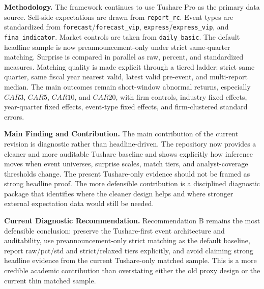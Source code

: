 \documentclass[11pt]{article}
\begin{document}
\noindent\textbf{Methodology.} The framework continues to use Tushare Pro as the primary data source. Sell-side expectations are drawn from \texttt{report\_rc}. Event types are standardized from \texttt{forecast}/\texttt{forecast\_vip}, \texttt{express}/\texttt{express\_vip}, and \texttt{fina\_indicator}. Market controls are taken from \texttt{daily\_basic}. The default headline sample is now preannouncement-only under strict same-quarter matching. Surprise is compared in parallel as raw, percent, and standardized measures. Matching quality is made explicit through a tiered ladder: strict same quarter, same fiscal year nearest valid, latest valid pre-event, and multi-report median. The main outcomes remain short-window abnormal returns, especially \(CAR3\), \(CAR5\), \(CAR10\), and \(CAR20\), with firm controls, industry fixed effects, year-quarter fixed effects, event-type fixed effects, and firm-clustered standard errors.

\noindent\textbf{Main Finding and Contribution.} The main contribution of the current revision is diagnostic rather than headline-driven. The repository now provides a cleaner and more auditable Tushare baseline and shows explicitly how inference moves when event universes, surprise scales, match tiers, and analyst-coverage thresholds change. The present Tushare-only evidence should not be framed as strong headline proof. The more defensible contribution is a disciplined diagnostic package that identifies where the cleaner design helps and where stronger external expectation data would still be needed.

\noindent\textbf{Current Diagnostic Recommendation.} Recommendation B remains the most defensible conclusion: preserve the Tushare-first event architecture and auditability, use preannouncement-only strict matching as the default baseline, report raw/pct/std and strict/relaxed tiers explicitly, and avoid claiming strong headline evidence from the current Tushare-only matched sample. This is a more credible academic contribution than overstating either the old proxy design or the current thin matched sample.
\end{document}
